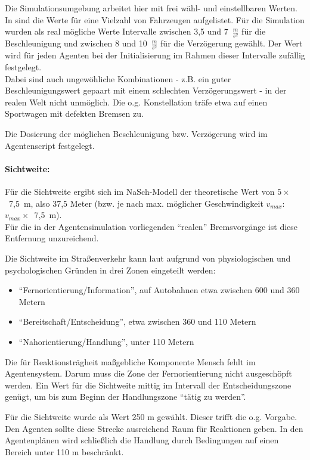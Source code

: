 Die Simulationsumgebung arbeitet hier mit frei wähl- und einstellbaren Werten. 
In \cite{unfallrekonstruktion} sind die Werte für eine Vielzahl von Fahrzeugen aufgelistet. 
Für die Simulation wurden als real mögliche Werte Intervalle zwischen 3,5 und \mbox{7 $\frac{m}{s^{2}}$} für die Beschleunigung und zwischen 8 und \mbox{10 $\frac{m}{s^{2}}$} für die Verzögerung gewählt.
Der Wert wird für jeden Agenten bei der Initialisierung im Rahmen dieser Intervalle zufällig festgelegt.
\\
Dabei sind auch ungewöhliche Kombinationen - z.B. ein guter Beschleunigungswert gepaart mit einem schlechten Verzögerungswert - in der realen Welt nicht unmöglich.
Die o.g. Konstellation träfe etwa auf einen Sportwagen mit defekten Bremsen zu.

Die Dosierung der möglichen Beschleunigung bzw. Verzögerung wird im Agentenscript festgelegt.

\paragraph*{Sichtweite:}
\label{sec:sichtweite}
Für die Sichtweite ergibt sich im NaSch-Modell der theoretische Wert von \mbox{$ 5 \times $ 7,5 m}, also 37,5 Meter (bzw. je nach max. möglicher Geschwindigkeit  $ v_{max} $: \mbox{$ v_{max} \times $ 7,5 m}).
\\
Für die in der Agentensimulation vorliegenden \enquote{realen} Bremsvorgänge ist diese Entfernung unzureichend. 

Die Sichtweite im Straßenverkehr kann laut \cite{sichtweite} aufgrund von physiologischen und psychologischen Gründen in drei Zonen eingeteilt werden:
\begin{itemize}
\itemsep0em
	\item \enquote{Fernorientierung/Information}, auf Autobahnen etwa zwischen 600 und 360 Metern
	\item \enquote{Bereitschaft/Entscheidung}, etwa zwischen 360 und 110 Metern
	\item \enquote{Nahorientierung/Handlung}, unter 110 Metern
\end{itemize}

Die für Reaktionsträgheit maßgebliche Komponente Mensch fehlt im Agentensystem. 
Darum muss die Zone der Fernorientierung nicht ausgeschöpft werden.
Ein Wert für die Sichtweite mittig im Intervall der Entscheidungszone genügt, um bis zum Beginn der Handlungszone \enquote{tätig zu werden}.

Für die Sichtweite wurde als Wert 250 m gewählt.
Dieser trifft die o.g. Vorgabe. 
Den Agenten sollte diese Strecke ausreichend Raum für Reaktionen geben. 
In den Agentenplänen wird schließlich die Handlung durch Bedingungen auf einen Bereich unter 110 m beschränkt.



